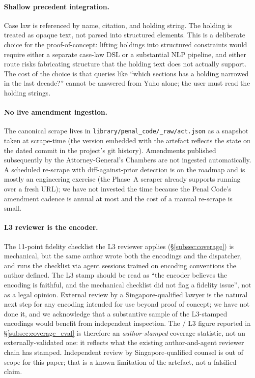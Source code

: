 \paragraph{Shallow precedent integration.} Case law is referenced
by name, citation, and holding string. The holding is treated as
opaque text, not parsed into structured elements. This is a
deliberate choice for the proof-of-concept: lifting holdings into
structured constraints would require either a separate case-law
DSL or a substantial NLP pipeline, and either route risks fabricating
structure that the holding text does not actually support. The cost
of the choice is that queries like ``which sections has a holding
narrowed in the last decade?'' cannot be answered from Yuho alone;
the user must read the holding strings.

\paragraph{No live amendment ingestion.} The canonical scrape lives
in \texttt{library/penal\_code/\_raw/act.json} as a snapshot taken
at scrape-time (the version embedded with the artefact reflects the
state on the dated commit in the project's git history). Amendments
published subsequently by the Attorney-General's Chambers are not
ingested automatically. A scheduled re-scrape with diff-against-prior
detection is on the roadmap and is mostly an engineering exercise
(the Phase~A scraper already supports running over a fresh URL); we
have not invested the time because the Penal Code's amendment cadence
is annual at most and the cost of a manual re-scrape is small.

\paragraph{L3 reviewer is the encoder.} The 11-point fidelity checklist
the L3 reviewer applies (\S\ref{subsec:coverage}) is mechanical, but
the same author wrote both the encodings and the dispatcher, and runs
the checklist via agent sessions trained on encoding conventions the
author defined. The L3 stamp should be read as ``the encoder
believes the encoding is faithful, and the mechanical checklist did
not flag a fidelity issue'', not as a legal opinion. External review
by a Singapore-qualified lawyer is the natural next step for any
encoding intended for use beyond proof of concept; we have not done
it, and we acknowledge that a substantive sample of the L3-stamped
encodings would benefit from independent inspection. The
\statLThreePass{}/\statRawSections{} L3 figure reported in
\S\ref{subsec:coverage_eval} is therefore an \emph{author-stamped}
coverage statistic, not an externally-validated one: it reflects what
the existing author-and-agent reviewer chain has stamped. Independent
review by Singapore-qualified counsel is out of scope for this paper;
that is a known limitation of the artefact, not a falsified claim.

